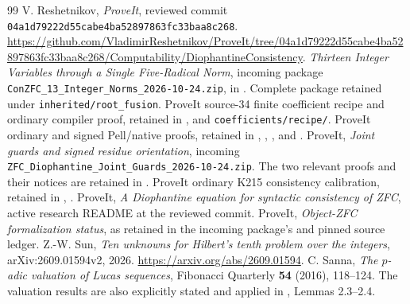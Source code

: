 \documentclass[11pt,a4paper]{article}
\theoremstyle{definition}\newtheorem{definition}[theorem]{Definition}
\theoremstyle{remark}\newtheorem{remark}[theorem]{Remark}
\numberwithin{equation}{section}
\begin{document}
\appendix


\begin{thebibliography}{99}
 V. Reshetnikov, \emph{ProveIt}, reviewed commit
\texttt{04a1d79222d55cabe4ba52897863fc33baa8c268}.
\url{https://github.com/VladimirReshetnikov/ProveIt/tree/04a1d79222d55cabe4ba52897863fc33baa8c268/Computability/DiophantineConsistency}.
 \emph{Thirteen Integer Variables through a Single
Five-Radical Norm}, incoming package
\texttt{ConZFC\_13\_Integer\_Norms\_2026-10-24.zip}, in \cite{repo}.
Complete package retained under \texttt{inherited/root\_fusion}.
 ProveIt source-34 finite coefficient recipe and ordinary
compiler proof, retained in \cite{fusion},
 and
\texttt{coefficients/recipe/}.
 ProveIt ordinary and signed Pell/native proofs, retained
in \cite{fusion}, ,
, and
.
 ProveIt, \emph{Joint guards and signed residue
orientation}, incoming
\texttt{ZFC\_Diophantine\_Joint\_Guards\_2026-10-24.zip}.
The two relevant proofs and their notices are retained in
.
 ProveIt ordinary K215 consistency calibration,
retained in \cite{fusion},
.
 ProveIt, \emph{A Diophantine equation for syntactic
consistency of ZFC}, active research README at the reviewed commit.
 ProveIt, \emph{Object-ZFC formalization status}, as
retained in the incoming package's
 and pinned source ledger.
 Z.-W. Sun, \emph{Ten unknowns for Hilbert's tenth problem
over the integers}, arXiv:2609.01594v2, 2026.
\url{https://arxiv.org/abs/2609.01594}.
 C. Sanna, \emph{The $p$-adic valuation of Lucas sequences},
Fibonacci Quarterly \textbf{54} (2016), 118--124. The valuation results are
also explicitly stated and applied in \cite{sun2026}, Lemmas 2.3--2.4.
\end{thebibliography}
\end{document}
